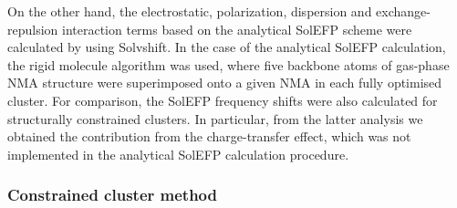 \documentclass[a4paper,titlepage,twoside,fleqn,12pt]{book}
\begin{document}
\begin{appendices}
\begin{refsection}
On the other
hand, the electrostatic, polarization, dispersion and exchange\hyp{}repulsion
interaction terms based on the analytical SolEFP scheme
were calculated by using {\sc Solvshift}. In the
case of the analytical SolEFP calculation, the rigid molecule
algorithm \citep{Blasiak.Lee.Cho.JCP.2013} 
was used, where five backbone atoms of gas-phase
NMA structure were superimposed onto a given NMA
in each fully optimised cluster. For comparison, the SolEFP
frequency shifts were also calculated for structurally constrained
clusters. In particular, from the latter analysis we
obtained the contribution from the charge\hyp{}transfer effect,
which was not implemented in the analytical SolEFP calculation
procedure. 

\subsubsection{Constrained cluster method\label{a:constrained-models}}


\end{refsection}
\end{appendices}
\end{document}
